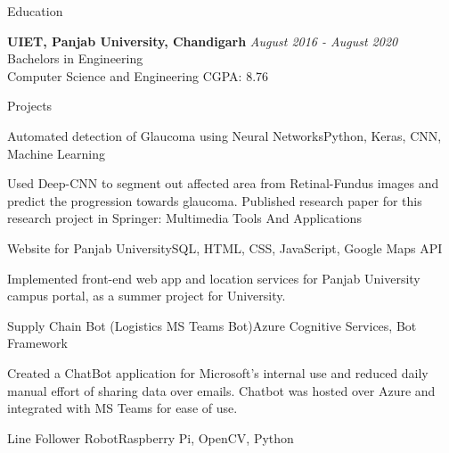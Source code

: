 \documentclass{resume} %
\begin{document}

    \begin{rSection}{Education}

        {\bf UIET, Panjab University, Chandigarh} \hfill {\em August 2016 - August 2020} 
        \\ Bachelors in Engineering
        \\ Computer Science and Engineering \hfill{CGPA: 8.76}
        
    \end{rSection}




    \begin{rSection}{Projects}

        \begin{pSubsection}{Automated detection of Glaucoma using Neural Networks}{Python, Keras, CNN, Machine Learning}{}{}
        
            \item Used Deep-CNN to segment out affected area from Retinal-Fundus images and predict the progression towards glaucoma. Published research paper for this research project in Springer: Multimedia Tools And Applications
            
        \end{pSubsection}
        

        \begin{pSubsection}{Website for Panjab University}{SQL, HTML, CSS, JavaScript, Google Maps API}{}{}
        
            \item Implemented front-end web app and location services for Panjab University campus portal, as a summer project for University.
        \end{pSubsection}


        \begin{pSubsection}{Supply Chain Bot (Logistics MS Teams Bot)}{Azure Cognitive Services, Bot Framework}{}{}
        
            \item Created a ChatBot application for Microsoft's internal use and reduced daily manual effort of sharing data over emails. Chatbot was hosted over Azure and integrated with MS Teams for ease of use.
        \end{pSubsection}
        
        
        \begin{pSubsection}{Line Follower Robot}{Raspberry Pi, OpenCV, Python}{}{}
        

\end{pSubsection}
\end{rSection}
\end{document}
